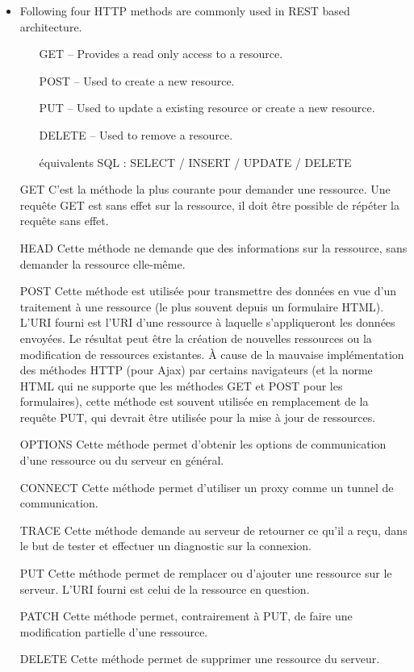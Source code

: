 \documentclass[11pt,twoside,a4paper]{article}
\begin{document}
\begin{landscape}
\begin{multicols}{2}
\begin{itemize}
		\item Following four HTTP methods are commonly used in REST based architecture.
		\begin{itemize}
			\item[] GET -- Provides a read only access to a resource.
			\item[] POST -- Used to create a new resource.
			\item[] PUT -- Used to update a existing resource or create a new resource.
			\item[] DELETE -- Used to remove a resource.
			\item[] {\footnotesize {\'e}quivalents SQL : SELECT / INSERT / UPDATE / DELETE}
		\end{itemize}
	\end{itemize}
	\begin{itemize}
	\footnotesize
		\item[GET] C'est la m{\'e}thode la plus courante pour demander une ressource. Une requ{\^e}te GET est sans effet sur la ressource, il doit {\^e}tre possible de r{\'e}p{\'e}ter la requ{\^e}te sans effet.
		\item[HEAD] Cette m{\'e}thode ne demande que des informations sur la ressource, sans demander la ressource elle-m{\^e}me.
		\item[POST] Cette m{\'e}thode est utilis{\'e}e pour transmettre des donn{\'e}es en vue d'un traitement {\`a} une ressource (le plus souvent depuis un formulaire HTML). L'URI fourni est l'URI d'une ressource {\`a} laquelle s'appliqueront les donn{\'e}es envoy{\'e}es. Le r{\'e}sultat peut {\^e}tre la cr{\'e}ation de nouvelles ressources ou la modification de ressources existantes. {\`A} cause de la mauvaise impl{\'e}mentation des m{\'e}thodes HTTP (pour Ajax) par certains navigateurs (et la norme HTML qui ne supporte que les m{\'e}thodes GET et POST pour les formulaires), cette m{\'e}thode est souvent utilis{\'e}e en remplacement de la requ{\^e}te PUT, qui devrait {\^e}tre utilis{\'e}e pour la mise {\`a} jour de ressources.
		\item[OPTIONS] Cette m{\'e}thode permet d'obtenir les options de communication d'une ressource ou du serveur en g{\'e}n{\'e}ral.
		\item[CONNECT] Cette m{\'e}thode permet d'utiliser un proxy comme un tunnel de communication.
		\item[TRACE] Cette m{\'e}thode demande au serveur de retourner ce qu'il a re\c{c}u, dans le but de tester et effectuer un diagnostic sur la connexion.
		\item[PUT] Cette m{\'e}thode permet de remplacer ou d'ajouter une ressource sur le serveur. L'URI fourni est celui de la ressource en question.
		\item[PATCH] Cette m{\'e}thode permet, contrairement {\`a} PUT, de faire une modification partielle d'une ressource.
		\item[DELETE] Cette m{\'e}thode permet de supprimer une ressource du serveur.
	\end{itemize}
	

\end{multicols}
\end{landscape}
\end{document}
